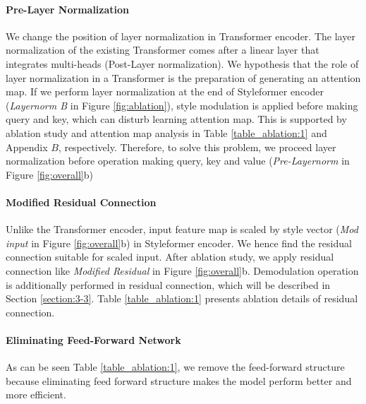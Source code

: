 \documentclass[10pt,twocolumn,letterpaper]{article}
\begin{document}
\paragraph{Pre-Layer Normalization}
We change the position of layer normalization in Transformer encoder. The layer normalization of the existing Transformer comes after a linear layer that integrates multi-heads (Post-Layer normalization). We hypothesis that the role of layer normalization in a Transformer is the preparation of generating an attention map. If we perform layer normalization at the end of Styleformer encoder (\textit{Layernorm B} in Figure \ref{fig:ablation}), style modulation is applied before making query and key, which can disturb learning attention map. This is supported by ablation study and attention map analysis in Table \ref{table_ablation:1} and Appendix $B$, respectively. 
Therefore, to solve this problem, we proceed layer normalization before operation making query, key and value (\textit{Pre-Layernorm} in Figure \ref{fig:overall}b) 

\paragraph{Modified Residual Connection}
Unlike the Transformer encoder, input feature map is scaled by style vector (\textit{Mod input} in Figure \ref{fig:overall}b) in Styleformer encoder. We hence find the residual connection suitable for scaled input. After ablation study, we apply residual connection like \textit{Modified Residual} in Figure \ref{fig:overall}b. Demodulation operation is additionally performed in residual connection, which will be described in Section \ref{section:3-3}. Table \ref{table_ablation:1} presents ablation details of residual connection. 





\paragraph{Eliminating Feed-Forward Network}


As can be seen Table \ref{table_ablation:1}, we remove the feed-forward structure because eliminating feed forward structure makes the model perform better and more efficient.
\end{document}
